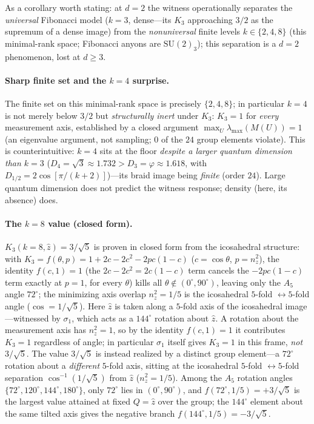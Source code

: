 \documentclass[aps,prx,reprint,amsmath,amssymb,floatfix,nofootinbib,superscriptaddress]{revtex4-2}
\begin{document}
As a corollary worth stating: at $d=2$ the witness operationally separates the
\emph{universal} Fibonacci model ($k=3$, dense---its $K_3$ approaching $3/2$ as the
supremum of a dense image) from the \emph{nonuniversal} finite levels
$k \in \{2,4,8\}$ (this minimal-rank space; Fibonacci anyons are $\mathrm{SU}(2)_3$); this separation is a
$d=2$ phenomenon, lost at $d \ge 3$.

\paragraph{Sharp finite set and the $k=4$ surprise.}
The finite set on this minimal-rank space is precisely $\{2,4,8\}$; in particular $k=4$ is not merely below
$3/2$ but \emph{structurally inert} under $K_3$: $K_3 = 1$ for \emph{every} measurement axis,
established by a closed argument $\max_U \lambda_{\max}(M(U)) = 1$ (an eigenvalue
argument, not sampling; $0$ of the $24$ group elements violate). This is
counterintuitive: $k=4$ sits at the floor \emph{despite a larger quantum dimension
than $k=3$} ($D_4 = \sqrt3 \approx 1.732 > D_3 = \varphi \approx 1.618$, with
$D_{1/2} = 2\cos[\pi/(k+2)]$)---its braid image being \emph{finite} (order $24$).
Large quantum dimension does not predict the witness response; density (here, its
absence) does.

\paragraph{The $k=8$ value (closed form).}
$K_3(k{=}8, \hat z) = 3/\sqrt5$ is proven in closed form from the icosahedral
structure: with $K_3 = f(\theta, p) = 1 + 2c - 2c^2 - 2pc(1-c)$ ($c = \cos\theta$,
$p = n_z^2$), the identity $f(c,1) = 1$ (the $2c-2c^2=2c(1-c)$ term cancels the
$-2pc(1-c)$ term exactly at $p=1$, for every $\theta$) kills all $\theta \notin
(0^\circ, 90^\circ)$,
leaving only the $A_5$ angle $72^\circ$; the minimizing axis overlap $n_z^2 = 1/5$ is
the icosahedral $5$-fold $\leftrightarrow 5$-fold angle ($\cos = 1/\sqrt5$). Here
$\hat z$ is taken along a $5$-fold axis of the icosahedral image---witnessed by
$\sigma_1$, which acts as a $144^\circ$ rotation about $\hat z$. A rotation about
the measurement axis has $n_z^2=1$, so by the identity $f(c,1)=1$ it contributes
$K_3=1$ regardless of angle; in particular $\sigma_1$ itself gives $K_3=1$ in this
frame, \emph{not} $3/\sqrt5$. The value $3/\sqrt5$ is instead realized by a
distinct group element---a $72^\circ$ rotation about a \emph{different} $5$-fold
axis, sitting at the icosahedral $5$-fold $\leftrightarrow 5$-fold separation
$\cos^{-1}(1/\sqrt5)$ from $\hat z$ ($n_z^2=1/5$). Among the $A_5$ rotation angles
$\{72^\circ,120^\circ,144^\circ,180^\circ\}$, only $72^\circ$ lies in
$(0^\circ,90^\circ)$, and $f(72^\circ,1/5) = +3/\sqrt5$ is the largest value
attained at fixed $Q=\hat z$ over the group; the $144^\circ$ element about the
same tilted axis gives the negative branch $f(144^\circ,1/5) = -3/\sqrt5$.
\end{document}
